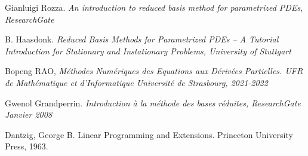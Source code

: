 \documentclass[12pt]{article}
\begin{document}
    
    




\begin{thebibliography}{9}

Gianluigi Rozza.  \emph{An introduction to reduced basis method for parametrized PDEs, ResearchGate}

B. Haasdonk.  \emph{Reduced Basis Methods for Parametrized PDEs –
A Tutorial Introduction for Stationary and
Instationary Problems, University of Stuttgart  } 



Bopeng RAO,  \emph{ Méthodes Numériques
des Equations aux Dérivées Partielles. UFR de Mathématique et d’Informatique
Université de Strasbourg, 2021-2022 }

Gwenol Grandperrin.  \emph{Introduction à la méthode des bases réduites, ResearchGate Janvier 2008 }


Dantzig, George B. Linear Programming and Extensions. Princeton University Press, 1963.

\end{thebibliography}
\end{document}
